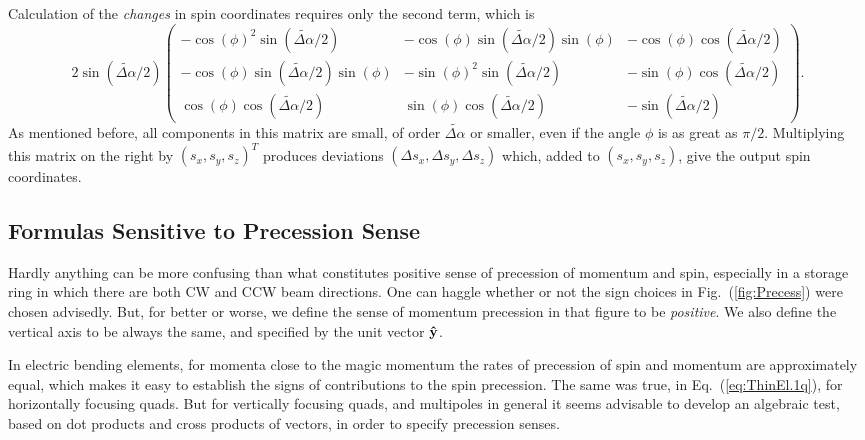 \documentclass[]{article}
\begin{document}
%
Calculation of the \emph{changes} in spin coordinates
requires only the second term, which is
%
\begin{equation}
2\sin(\widetilde{\Delta\alpha}/2)
\begin{pmatrix} 
 -\cos(\phi)^2\sin(\widetilde{\Delta\alpha}/2)         & -\cos(\phi)\sin(\widetilde{\Delta\alpha}/2)\sin(\phi) & -\cos(\phi)\cos(\widetilde{\Delta\alpha}/2)  \\
 -\cos(\phi)\sin(\widetilde{\Delta\alpha}/2)\sin(\phi) & -\sin(\phi)^2\sin(\widetilde{\Delta\alpha}/2)         & -\sin(\phi)\cos(\widetilde{\Delta\alpha}/2)  \\
  \cos(\phi)\cos(\widetilde{\Delta\alpha}/2)           &  \sin(\phi)\cos(\widetilde{\Delta\alpha}/2)           & -\sin(\widetilde{\Delta\alpha}/2)
\end{pmatrix}.
\label{eq:ThinEl.4q}
\end{equation}
%
As mentioned before, all components in this matrix are small, 
of order $\widetilde{\Delta\alpha}$ or
smaller, even if the angle $\phi$ is as great as $\pi/2$. 
Multiplying this matrix on the right by $(s_x,s_y,s_z)^T$
produces deviations $(\Delta s_x,\Delta s_y,\Delta s_z)$
which, added to $(s_x,s_y,s_z)$, give the output spin coordinates.

\subsection{Formulas Sensitive to Precession Sense}
Hardly anything can be more confusing than what constitutes
positive sense of precession of momentum and spin, especially
in a storage ring in which there are both CW and CCW beam
directions. One can haggle whether or not the sign choices
in Fig.~(\ref{fig:Precess}) were chosen advisedly. But, for better or
worse, we define the sense of momentum precession in that figure to 
be \emph{positive}. We also define the vertical axis to be
always the same, and specified by the unit vector ${\bf\hat y}$. 

In electric bending elements, for momenta close to the magic momentum
the rates of precession of spin and momentum are approximately
equal, which makes it easy to establish the signs of contributions
to the spin precession. The same was true, in 
Eq.~(\ref{eq:ThinEl.1q}), for horizontally focusing quads.
But for vertically focusing quads, and multipoles in general
it seems advisable to develop an algebraic test, based on
dot products and cross products of vectors, in order to
specify precession senses.
\end{document}
